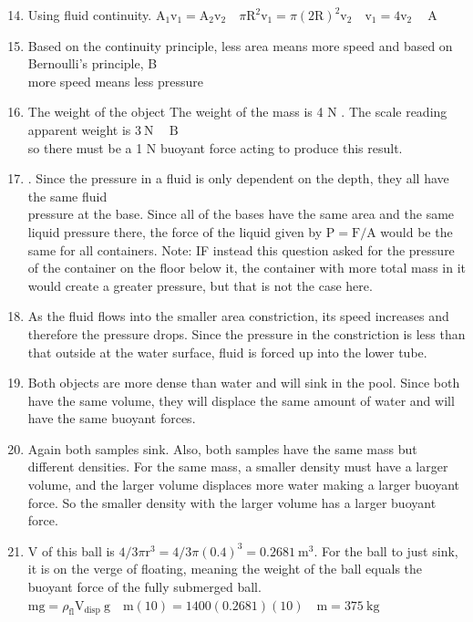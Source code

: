 \begin{enumerate}
\begin{enumerate}
  \setcounter{enumi}{13}
  \item Using fluid continuity. $\mathrm{A}_{1} \mathrm{v}_{1}=\mathrm{A}_{2} \mathrm{v}_{2} \quad \pi \mathrm{R}^{2} \mathrm{v}_{1}=\pi(2 \mathrm{R})^{2} \mathrm{v}_{2} \quad \mathrm{v}_{1}=4 \mathrm{v}_{2} \quad \mathrm{~A}$
  \item Based on the continuity principle, less area means more speed and based on Bernoulli's principle, B\\
more speed means less pressure
  \item The weight of the object The weight of the mass is 4 N . The scale reading apparent weight is $3 \mathrm{~N} \quad \mathrm{~B}$\\
so there must be a 1 N buoyant force acting to produce this result.
  \item . Since the pressure in a fluid is only dependent on the depth, they all have the same fluid\\
pressure at the base. Since all of the bases have the same area and the same liquid pressure there, the force of the liquid given by $\mathrm{P}=\mathrm{F} / \mathrm{A}$ would be the same for all containers. Note: IF instead this question asked for the pressure of the container on the floor below it, the container with more total mass in it would create a greater pressure, but that is not the case here.
  \item As the fluid flows into the smaller area constriction, its speed increases and therefore the pressure drops. Since the pressure in the constriction is less than that outside at the water surface, fluid is forced up into the lower tube.
  \item Both objects are more dense than water and will sink in the pool. Since both have the same volume, they will displace the same amount of water and will have the same buoyant forces.
  \item Again both samples sink. Also, both samples have the same mass but different densities. For the same mass, a smaller density must have a larger volume, and the larger volume displaces more water making a larger buoyant force. So the smaller density with the larger volume has a larger buoyant force.
  \item V of this ball is $4 / 3 \pi \mathrm{r}^{3}=4 / 3 \pi(0.4)^{3}=0.2681 \mathrm{~m}^{3}$. For the ball to just sink, it is on the verge of floating, meaning the weight of the ball equals the buoyant force of the fully submerged ball. $\mathrm{mg}=\rho_{\mathrm{fl}} \mathrm{V}_{\text {disp }} \mathrm{g} \quad \mathrm{m}(10)=1400(0.2681)(10) \quad \mathrm{m}=375 \mathrm{~kg}$

\end{enumerate}
\end{enumerate}
